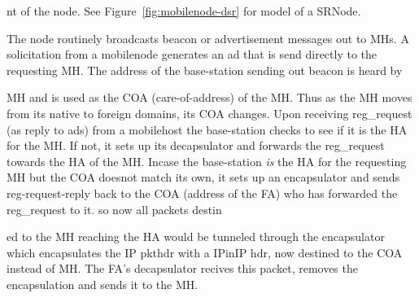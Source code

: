 {nt of the node. See Figure~\ref{fig:mobilenode-dsr} for model of a SRNode.

The  node routinely broadcasts beacon or advertisement messages out to MHs. A solicitation from a mobilenode generates an ad that is send directly to the requesting MH. The address of the base-station sending out beacon is heard by 






















MH and is used as the COA (care-of-address) of the MH. Thus as the MH moves from its native to foreign domains, its COA changes.
Upon receiving  reg\_request (as reply to ads) from a mobilehost the base-station checks to see if it is the HA for the MH. If not, it sets up its decapsulator and forwards the reg\_request towards the HA of the MH. 
Incase the base-station {\em is} the HA for the requesting MH but the COA doesnot match its own, it sets up an encapsulator and sends reg-request-reply back to the COA (address of the FA) who has forwarded the reg\_request to it. so now all packets destin






















ed to the MH reaching the HA would be tunneled through the encapsulator which encapsulates the IP pkthdr with a IPinIP hdr, now destined to the COA instead of MH. The FA's decapsulator recives this packet, removes the encapsulation and sends it to the MH.























}
